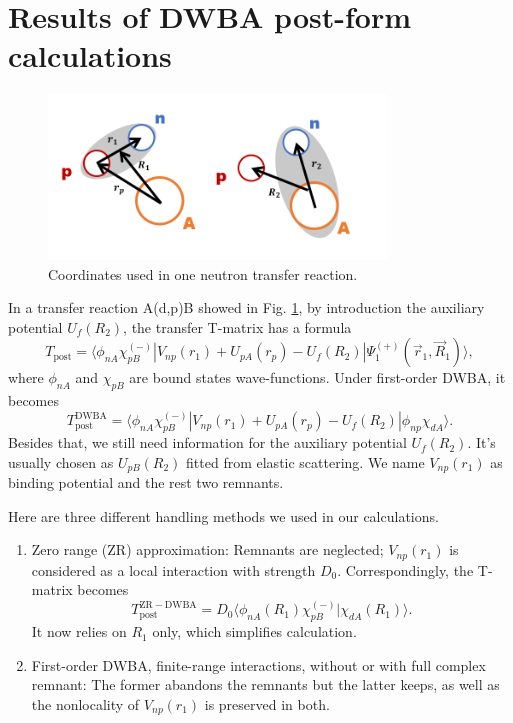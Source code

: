 \section{Results of DWBA post-form calculations}\label{sec:post}

\begin{figure}[t]
	\centering
	\includegraphics[width=0.80\textwidth]{transfer.png}
	\caption{Coordinates used in one neutron transfer reaction. }
	\label{fig:transfer}
\end{figure}
In a transfer reaction A(d,p)B showed in Fig. \ref{fig:transfer}, by introduction the auxiliary potential $U_f(R_2)$, the transfer T-matrix has a formula \cite{thompson2009nuclear}
\begin{equation}\label{eq:postexact}
	T_{\mathrm{post}}=\langle\phi_{nA}\chi_{pB}^{(-)}\left|V_{np}(r_1)+U_{pA}(r_p)-U_f(R_2)\right|\Psi_1^{(+)}(\vec{r}_1,\vec{R}_1)\rangle,
\end{equation}
where $\phi_{nA}$ and $\chi_{pB}$ are bound states wave-functions. 
Under first-order DWBA, it becomes
\begin{equation}\label{tpost}
	T_{\mathrm{post}}^{\mathrm{DWBA}}=\langle\phi_{nA}\chi_{pB}^{(-)}\left|V_{np}(r_1)+U_{pA}(r_p)-U_f(R_2)\right|\phi_{np}\chi_{dA}\rangle.
\end{equation}
Besides that, we still need information for the auxiliary potential $U_f(R_2)$. 
It's usually chosen as $U_{pB}(R_2)$ fitted from elastic scattering.
We name $V_{np}(r_1)$ as binding potential and the rest two remnants.

Here are three different handling methods we used in our calculations.
\begin{enumerate}
\item Zero range (ZR) approximation: Remnants are neglected; $V_{np}(r_1)$ is considered as a local interaction with strength $D_0$.
	Correspondingly, the T-matrix becomes
	\begin{equation}
		T_{\mathrm{post}}^{\mathrm{ZR-DWBA}}=D_0\langle\phi_{nA}(R_1)\chi_{pB}^{(-)}| \chi_{dA}(R_1)\rangle.
	\end{equation}
	It now relies on $R_1$ only, which simplifies calculation.
	\item First-order DWBA, finite-range interactions, without or with full complex remnant: The former abandons the remnants but the latter keeps, as well as the nonlocality of $V_{np}(r_1)$ is preserved in both.
\end{enumerate}


